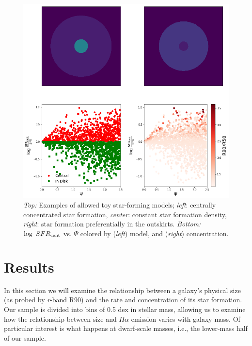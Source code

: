 \documentclass[iop]{emulateapj}
\begin{document}
\begin{figure}
	\centering
	\includegraphics[width=1.4 \columnwidth]{model.png}
	\caption{\textit{Top:} Examples of allowed toy star-forming models; \textit{left}: centrally concentrated star formation, \textit{center}: constant star formation density, \textit{right}: star formation preferentially in the outskirts. \textit{Bottom:} $\log \  SFR_{\rm cent}$ vs. $\Psi$ colored by (\textit{left}) model, and (\textit{right}) concentration.}
	\label{fig:model}
	
\end{figure}


\section{Results}
\label{sec:results}

In this section we will examine the relationship between a galaxy's physical size (as probed by \textit{r}-band R90) and the rate and concentration of its star formation. Our sample is divided into bins of 0.5 dex in stellar mass, allowing us to examine how the relationship between size and $H\alpha$ emission varies with galaxy mass. Of particular interest is what happens at dwarf-scale masses, i.e., the lower-mass half of our sample.
\end{document}
